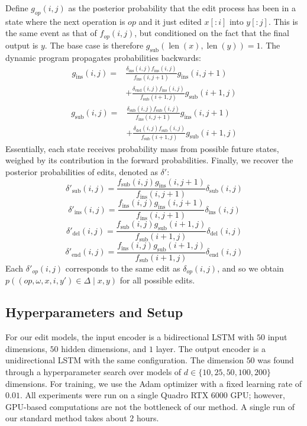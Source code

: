 \documentclass[11pt]{article}
\DeclareMathOperator{\len}{len}
\begin{document}
Define $g_{op}(i, j)$ as the posterior probability that the edit process has been in a state where the next operation is $op$ and it just edited $x[{:}i]$ into $y[{:}j]$. This is the same event as that of $f_{op}(i, j)$, but conditioned on the fact that the final output is $y$. The base case is therefore $g_{\text{sub}}(\len(x), \len(y))=1$. The dynamic program propagates probabilities backwards:
\[
\begin{split}
g_{\text{ins}}(i, j) = &\frac{\delta_{\text{ins}}(i, j)f_{\text{ins}}(i, j)}{f_{\text{ins}}(i, j+1)} g_{\text{ins}}(i, j+1)
\\& + \frac{\delta_{\text{end}}(i, j)f_{\text{ins}}(i, j)}{f_{\text{sub}}(i+1, j)}g_{\text{sub}}(i+1, j)
\end{split}\]
\[
\begin{split}
g_{\text{sub}}(i, j) = &\frac{\delta_{\text{sub}}(i, j)f_{\text{sub}}(i, j)}{f_{\text{ins}}(i, j+1)} g_{\text{ins}}(i, j+1)
\\& + \frac{\delta_{\text{del}}(i, j)f_{\text{sub}}(i, j)}{f_{\text{sub}}(i+1, j)}g_{\text{sub}}(i+1, j)
\end{split}\]
Essentially, each state receives probability mass from possible future states, weighed by its contribution in the forward probabilities. Finally, we recover the posterior probabilities of edits, denoted as $\delta'$:
\[\delta'_{\text{sub}}(i, j) = \frac{f_{\text{sub}}(i, j)g_{\text{ins}}(i, j+1)}{f_{\text{ins}}(i, j+1)} \delta_{\text{sub}}(i, j)\]
\[\delta'_{\text{ins}}(i, j) = \frac{f_{\text{ins}}(i, j)g_{\text{ins}}(i, j+1)}{f_{\text{ins}}(i, j+1)}\delta_{\text{ins}}(i, j) \]
\[\delta'_{\text{del}}(i, j) = \frac{f_{\text{sub}}(i, j)g_{\text{sub}}(i+1, j)}{f_{\text{sub}}(i+1, j)}\delta_{\text{del}}(i, j)\]
\[\delta'_{\text{end}}(i, j) = \frac{f_{\text{ins}}(i, j)g_{\text{sub}}(i+1, j)}{f_{\text{sub}}(i+1, j)}\delta_{\text{end}}(i, j)\]
Each $\delta'_{op}(i, j)$ corresponds to the same edit as $\delta_{op}(i, j)$, and so we obtain $p((op, \omega, x, i, y') \in \Delta \mid x, y)$ for all possible edits.

\subsection{Hyperparameters and Setup}
For our edit models, the input encoder is a bidirectional LSTM with $50$ input dimensions, $50$ hidden dimensions, and $1$ layer. The output encoder is a unidirectional LSTM with the same configuration. The dimension $50$ was found through a hyperparameter search over models of $d \in \{10, 25, 50, 100, 200\}$ dimensions. For training, we use the Adam optimizer with a fixed learning rate of $0.01$. All experiments were run on a single Quadro RTX 6000 GPU; however, GPU-based computations are not the bottleneck of our method. A single run of our standard method takes about $2$ hours. 
\end{document}
